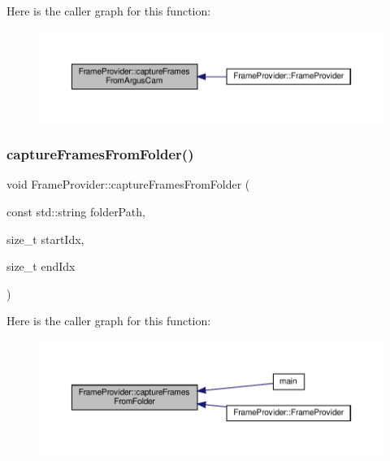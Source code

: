 Here is the caller graph for this function\+:\nopagebreak
\begin{figure}[H]
\begin{center}
\leavevmode
\includegraphics[width=350pt]{classFrameProvider_a15097906b20d2d564b9bfea82c2f956c_icgraph}
\end{center}
\end{figure}
\mbox{\label{classFrameProvider_aa8334a484db470ee01b8718ab05ca997}} 
\subsubsection{\texorpdfstring{capture\+Frames\+From\+Folder()}{captureFramesFromFolder()}}
{\footnotesize\ttfamily void Frame\+Provider\+::capture\+Frames\+From\+Folder (\begin{DoxyParamCaption}\item[{const std\+::string}]{folder\+Path,  }\item[{size\+\_\+t}]{start\+Idx,  }\item[{size\+\_\+t}]{end\+Idx }\end{DoxyParamCaption})}

Here is the caller graph for this function\+:\nopagebreak
\begin{figure}[H]
\begin{center}
\leavevmode
\includegraphics[width=350pt]{classFrameProvider_aa8334a484db470ee01b8718ab05ca997_icgraph}
\end{center}
\end{figure}


